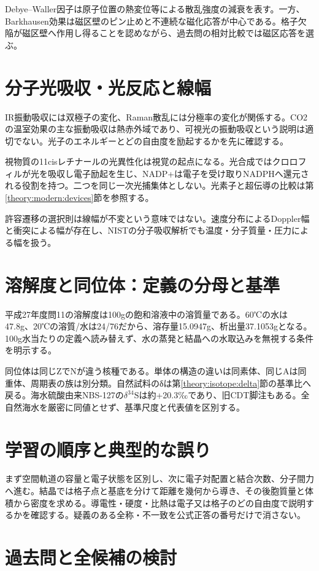 Debye--Waller因子は原子位置の熱変位等による散乱強度の減衰を表す。一方、Barkhausen効果は磁区壁のピン止めと不連続な磁化応答が中心である\cite{atomic_barkhausen}。格子欠陥が磁区壁へ作用し得ることを認めながら、過去問の相対比較では磁区応答を選ぶ。

\section{分子光吸収・光反応と線幅}\label{theory:atomic:optical}
IR振動吸収には双極子の変化、Raman散乱には分極率の変化が関係する\cite{atomic_ir_raman}。CO2の温室効果の主な振動吸収は熱赤外域であり、可視光の振動吸収という説明は適切でない\cite{atomic_ir_co2}。光子のエネルギーとどの自由度を励起するかを先に確認する。

視物質の11cisレチナールの光異性化は視覚の起点になる\cite{atomic_retinal}。光合成ではクロロフィルが光を吸収し電子励起を生じ、NADP+は電子を受け取りNADPHへ還元される役割を持つ\cite{atomic_photosynthesis}。二つを同じ一次光捕集体としない。光素子と超伝導の比較は第\ref{theory:modern:devices}節を参照する。

許容遷移の選択則は線幅が不変という意味ではない。速度分布によるDoppler幅と衝突による幅が存在し、NISTの分子吸収解析でも温度・分子質量・圧力による幅を扱う\cite{atomic_linewidth}。

\section{溶解度と同位体：定義の分母と基準}\label{theory:atomic:solubility}\label{theory:atomic:isotopes}
平成27年度問11の溶解度は100gの飽和溶液中の溶質量である。60℃の水は47.8g、20℃の溶質/水は24/76だから、溶存量15.0947g、析出量37.1053gとなる。100g水当たりの定義へ読み替えず、水の蒸発と結晶への水取込みを無視する条件を明示する。

同位体は同じZでNが違う核種である。単体の構造の違いは同素体、同じAは同重体、周期表の族は別分類。自然試料のδは第\ref{theory:isotope:delta}節の基準比へ戻る。海水硫酸由来NBS-127の\(\delta^{34}\mathrm S\)は約+20.3‰であり、旧CDT脚注もある\cite{atomic_sulfate}。全自然海水を厳密に同値とせず、基準尺度と代表値を区別する。

\section{学習の順序と典型的な誤り}
まず空間軌道の容量と電子状態を区別し、次に電子対配置と結合次数、分子間力へ進む。結晶では格子点と基底を分けて距離を幾何から導き、その後胞質量と体積から密度を求める。導電性・硬度・比熱は電子又は格子のどの自由度で説明するかを確認する。疑義のある全称・不一致を公式正答の番号だけで消さない。

\section{過去問と全候補の検討}

